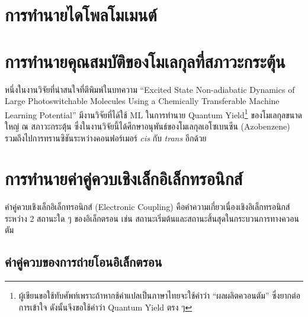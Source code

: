 \section{การทำนายไดโพลโมเมนต์}
\label{sec:pred_dipole_moment}

\section{การทำนายคุณสมบัติของโมเลกุลที่สภาวะกระตุ้น}
\label{sec:pred_ex_prop}

หนึ่งในงานวิจัยที่น่าสนใจที่ตีพิมพ์ในบทความ \enquote{Excited State Non-adiabatic Dynamics of Large Photoswitchable Molecules 
Using a Chemically Transferable Machine Learning Potential}\autocite{axelrod2022} มีงานวิจัยที่ได้ใช้ ML ในการทำนาย 
Quantum Yield\footnote{ผู้เขียนขอใช้ทับศัพท์เพราะถ้าหากช้คำแปลเป็นภาษาไทยจะใช้คำว่า \enquote{ผลผลิตควอนตัม} ซึ่งยากต่อการเข้าใจ 
ดังนั้นจึงขอใช้คำว่า Quantum Yield ตรง ๆ} ของโมเลกุลขนาดใหญ่ ณ สภาวะกระตุ้น ซึ่งในงานวิจัยนี้ได้ศึกษาอนุพันธ์ของโมเลกุลเอโซเบนซีน 
(Azobenzene) รวมถึงไปการทรานซิชันระหว่างคอนฟอร์เมอร์ \textit{cis} กับ \textit{trans} อีกด้วย

\section{การทำนายค่าคู่ควบเชิงเล็กอิเล็กทรอนิกส์}
\label{sec:pred_elec_coupling}

ค่าคู่ควบเชิงเล็กอิเล็กทรอนิกส์ (Electronic Coupling) คือค่าความเกี่ยวเนื่องเชิงอิเล็กทรอนิกส์ระหว่าง 2 สถานะใด ๆ ของอิเล็กตรอน เช่น 
สถานะเริ่มต้นและสถานะสิ้นสุดในกระบวนการทางควอนตัม 

\subsection{ค่าคู่ควบของการถ่ายโอนอิเล็กตรอน}
\label{ssec:pred_etran_coupling}



